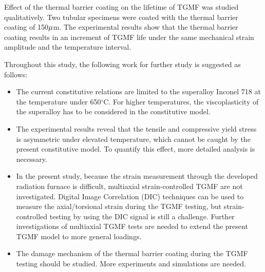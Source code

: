 Effect of the thermal barrier coating on the lifetime of TGMF was studied qualitatively. Two tubular specimens were coated with the thermal barrier coating of 150$\rm \mu$m. The experimental results show that the thermal barrier coating results in an increment of TGMF life under the same mechanical strain amplitude and the temperature interval. 

Throughout this study, the following work for further study is suggested as follows:
\begin{itemize}
\item The current constitutive relations are limited to the superalloy Inconel 718 at the temperature under 650$^\circ$C. For higher temperatures, the viscoplasticity of the superalloy has to be considered in the constitutive model. 

\item The experimental results reveal that the tensile and compressive yield stress is asymmetric under elevated temperature, which cannot be caught by the present constitutive model. To quantify this effect, more detailed analysis is necessary.

\item In the present study, because the strain measurement through the developed radiation furnace is difficult, multiaxial strain-controlled TGMF are not investigated. Digital Image Correlation (DIC) techniques can be used to measure the axial/torsional strain during the TGMF testing, but strain-controlled testing by using the DIC signal is still a challenge. Further investigations of multiaxial TGMF tests are needed to extend the present TGMF model to more general loadings.

\item The damage mechanism of the thermal barrier coating during the TGMF testing should be studied. More experiments and simulations are needed.
\end{itemize}